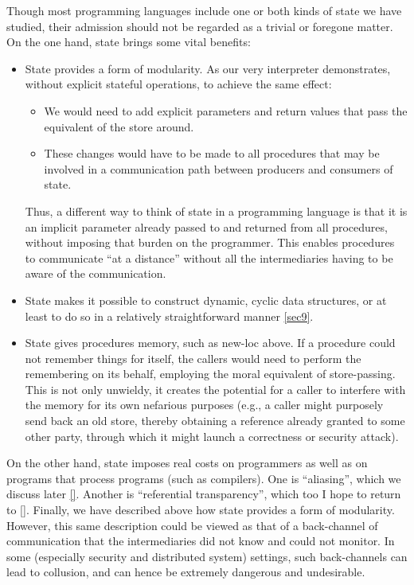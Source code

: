 
Though most programming languages include one or both kinds of state we have
studied, their admission should not be regarded as a trivial or foregone matter.
On the one hand, state brings some vital benefits:

\begin{itemize}
  \item 
State provides a form of modularity. As our very interpreter demonstrates,
without explicit stateful operations, to achieve the same effect:
\begin{itemize}
  \item 
We would need to add explicit parameters and return values that pass the
equivalent of the store around.
  \item
These changes would have to be made to all procedures that may be involved in a
communication path between producers and consumers of state.
\end{itemize}

Thus, a different way to think of state in a programming language is that it is
an implicit parameter already passed to and returned from all procedures,
without imposing that burden on the programmer. This enables procedures to
communicate “at a distance” without all the intermediaries having to be aware of
the communication.

  \item
State makes it possible to construct dynamic, cyclic data structures, or at
least to do so in a relatively straightforward manner \ref{sec9}.

  \item
State gives procedures memory, such as new-loc above. If a procedure could not
remember things for itself, the callers would need to perform the remembering on
its behalf, employing the moral equivalent of store-passing. This is not only
unwieldy, it creates the potential for a caller to interfere with the memory for
its own nefarious purposes (e.g., a caller might purposely send back an old
store, thereby obtaining a reference already granted to some other party,
through which it might launch a correctness or security attack).

\end{itemize}

On the other hand, state imposes real costs on programmers as well as on
programs that process programs (such as compilers). One is “aliasing”, which we
discuss later \ref{}. Another is “referential transparency”, which too I
hope to return to \ref{}. Finally, we have described above how state provides a
form of modularity. However, this same description could be viewed as that of a
back-channel of communication that the intermediaries did not know and could not
monitor. In some (especially security and distributed system) settings, such
back-channels can lead to collusion, and can hence be extremely dangerous and
undesirable.

